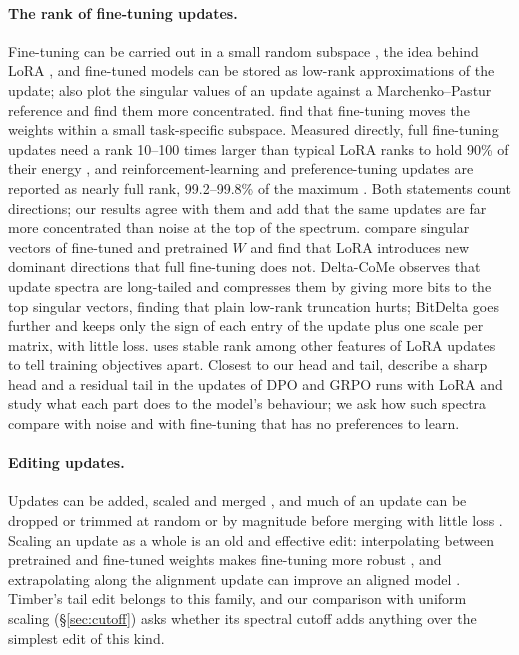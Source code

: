 \paragraph{The rank of fine-tuning updates.} Fine-tuning can be carried out in
a small random subspace \citep{aghajanyan2021intrinsic}, the idea behind LoRA
\citep{hu2022lora}, and fine-tuned models can be stored as low-rank
approximations of the update; \citet{ryu2023efficient} also plot the singular
values of an update against a Marchenko--Pastur reference and find them more
concentrated. \citet{zhang2023tiny} find that fine-tuning moves the
weights within a small task-specific subspace. Measured directly, full
fine-tuning updates need a rank 10--100 times larger than typical LoRA ranks to
hold 90\% of their energy \citep{biderman2024lora}, and reinforcement-learning
and preference-tuning updates are reported as nearly full rank, 99.2--99.8\%
of the maximum
\citep{mukherjee2025rl}. Both statements count directions; our results agree
with them and add that the same updates are far more concentrated than noise at
the top of the spectrum. \citet{shuttleworth2025lora} compare singular vectors
of fine-tuned and pretrained $W$ and find that LoRA introduces new dominant
directions that full fine-tuning does not. Delta-CoMe \citep{ping2024deltacome}
observes that update spectra are long-tailed and compresses them by giving more
bits to the top singular vectors, finding that plain low-rank truncation hurts;
BitDelta \citep{liu2024bitdelta} goes further and keeps only the sign of each
entry of the update plus one scale per matrix, with little loss.
\citet{paul2026spectral} uses stable rank among other features of LoRA updates
to tell training objectives apart. Closest to our head and tail,
\citet{zhang2026preference} describe a sharp head and a residual tail in the
updates of DPO and GRPO runs with LoRA and study what each part does to the
model's behaviour; we ask how such spectra compare with noise and with
fine-tuning that has no preferences to learn.

\paragraph{Editing updates.} Updates can be added, scaled and merged
\citep{ilharco2023task}, and much of an update can be dropped or trimmed at
random or by magnitude before merging with little loss
\citep{yu2024dare, yadav2023ties}. Scaling an update as a whole is an old and
effective edit: interpolating between pretrained and fine-tuned weights makes
fine-tuning more robust \citep{wortsman2022wiseft}, and extrapolating along
the alignment update can improve an aligned model \citep{zheng2025expo}.
Timber's tail edit belongs to this family, and our comparison with uniform
scaling (\S\ref{sec:cutoff}) asks whether its spectral cutoff adds anything
over the simplest edit of this kind.

